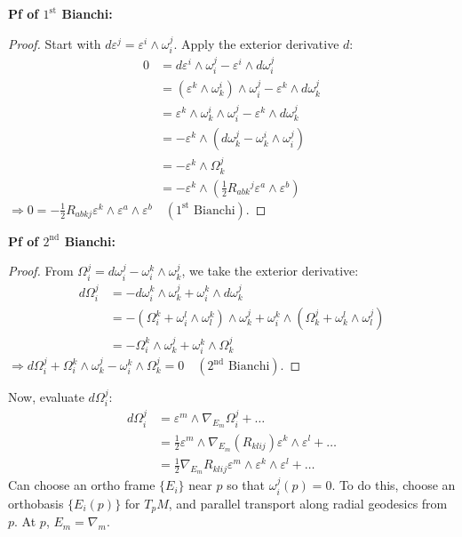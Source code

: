 \documentclass[11pt, a4paper]{article}
\theoremstyle{plain}
\theoremstyle{definition}
\theoremstyle{remark}
\begin{document}
{\noindent \textbf{Pf of $1^{\text{st}}$ Bianchi:}
\begin{proof}
Start with $d\varepsilon^j = \varepsilon^i \wedge \omega_i^j$. Apply the exterior derivative $d$:
\begin{align*}
0 &= d\varepsilon^i \wedge \omega_i^j - \varepsilon^i \wedge d\omega_i^j \\
&= (\varepsilon^k \wedge \omega_k^i) \wedge \omega_i^j - \varepsilon^k \wedge d\omega_k^j \\
&= \varepsilon^k \wedge \omega_k^i \wedge \omega_i^j - \varepsilon^k \wedge d\omega_k^j \\
&= -\varepsilon^k \wedge (d\omega_k^j - \omega_k^i \wedge \omega_i^j) \\
&= -\varepsilon^k \wedge \Omega_k^j \\
&= -\varepsilon^k \wedge \left( \frac{1}{2} R_{abk}{}^j \varepsilon^a \wedge \varepsilon^b \right)
\end{align*}
$\Rightarrow 0 = -\frac{1}{2} R_{abkj} \varepsilon^k \wedge \varepsilon^a \wedge \varepsilon^b \quad (1^{\text{st}} \text{ Bianchi})$.
\end{proof}

\noindent \textbf{Pf of $2^{\text{nd}}$ Bianchi:}
\begin{proof}
From $\Omega_i^j = d\omega_i^j - \omega_i^k \wedge \omega_k^j$, we take the exterior derivative:
\begin{align*}
d\Omega_i^j &= -d\omega_i^k \wedge \omega_k^j + \omega_i^k \wedge d\omega_k^j \\
&= -(\Omega_i^k + \omega_i^l \wedge \omega_l^k) \wedge \omega_k^j + \omega_i^k \wedge (\Omega_k^j + \omega_k^l \wedge \omega_l^j) \\
&= -\Omega_i^k \wedge \omega_k^j + \omega_i^k \wedge \Omega_k^j
\end{align*}
$\Rightarrow d\Omega_i^j + \Omega_i^k \wedge \omega_k^j - \omega_i^k \wedge \Omega_k^j = 0 \quad (2^{\text{nd}} \text{ Bianchi})$.
\end{proof}

Now, evaluate $d\Omega_i^j$:
\begin{align*}
d\Omega_i^j &= \varepsilon^m \wedge \nabla_{E_m} \Omega_i^j + \dots \\
&= \frac{1}{2} \varepsilon^m \wedge \nabla_{E_m} (R_{klij}) \varepsilon^k \wedge \varepsilon^l + \dots \\
&= \frac{1}{2} \nabla_{E_m} R_{klij} \varepsilon^m \wedge \varepsilon^k \wedge \varepsilon^l + \dots
\end{align*}
Can choose an ortho frame $\{E_i\}$ near $p$ so that $\omega_i^j(p) = 0$. To do this, choose an orthobasis $\{E_i(p)\}$ for $T_pM$, and parallel transport along radial geodesics from $p$. At $p$, $E_m = \nabla_m$.

}
\end{document}

